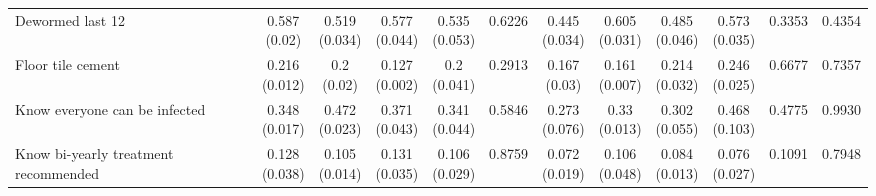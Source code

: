 {\begin{tabular}[t]{lccccccccccc}
\hspace{1em}Dewormed last 12 & \makecell[c]{0.587\\(0.02)} & \makecell[c]{0.519\\(0.034)} & \makecell[c]{0.577\\(0.044)} & \makecell[c]{0.535\\(0.053)} & 0.6226 & \makecell[c]{0.445\\(0.034)} & \makecell[c]{0.605\\(0.031)} & \makecell[c]{0.485\\(0.046)} & \makecell[c]{0.573\\(0.035)} & 0.3353 & 0.4354\\
\hspace{1em}Floor tile cement & \makecell[c]{0.216\\(0.012)} & \makecell[c]{0.2\\(0.02)} & \makecell[c]{0.127\\(0.002)} & \makecell[c]{0.2\\(0.041)} & 0.2913 & \makecell[c]{0.167\\(0.03)} & \makecell[c]{0.161\\(0.007)} & \makecell[c]{0.214\\(0.032)} & \makecell[c]{0.246\\(0.025)} & 0.6677 & 0.7357\\
\hspace{1em}Know everyone can be infected & \makecell[c]{0.348\\(0.017)} & \makecell[c]{0.472\\(0.023)} & \makecell[c]{0.371\\(0.043)} & \makecell[c]{0.341\\(0.044)} & 0.5846 & \makecell[c]{0.273\\(0.076)} & \makecell[c]{0.33\\(0.013)} & \makecell[c]{0.302\\(0.055)} & \makecell[c]{0.468\\(0.103)} & 0.4775 & 0.9930\\
\hspace{1em}Know bi-yearly treatment recommended & \makecell[c]{0.128\\(0.038)} & \makecell[c]{0.105\\(0.014)} & \makecell[c]{0.131\\(0.035)} & \makecell[c]{0.106\\(0.029)} & 0.8759 & \makecell[c]{0.072\\(0.019)} & \makecell[c]{0.106\\(0.048)} & \makecell[c]{0.084\\(0.013)} & \makecell[c]{0.076\\(0.027)} & 0.1091 & 0.7948\\

\end{tabular}}
